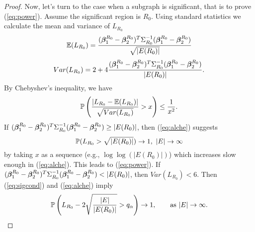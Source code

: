 \begin{proof}
Now, let's turn to the case when a subgraph is significant, that is to prove (\ref{eq:power}). Assume the significant region is $R_0$. Using standard statistics we calculate the mean and variance of $L_{R_0}$
$$
\mathbb{E}(L_{R_0})=\frac{(\bm{\beta}_1^{R_0}-\bm{\beta}_2^{R_0})^T\Sigma_{R_0}^{-1}(\bm{\beta}_1^{R_0}-\bm{\beta}_2^{R_0})}{ \sqrt{|E({R_0})|}}
$$
$$ Var(L_{R_0})=2+4\frac{(\bm{\beta}_1^{R_0}-\bm{\beta}_2^{R_0})^T\Sigma_{R_0}^{-1}(\bm{\beta}_1^{R_0}-\bm{\beta}_2^{R_0})}{ |E({R_0})|}.
$$
By Chebyshev's inequality, we have
\begin{equation}
\label{eq:alche}
\mathbb{P}\left(\frac{|L_{R_0}-\mathbb{E}(L_{R_0})|}{ \sqrt{Var(L_{R_0})}}>x\right)\le \frac{1}{x^2}.
\end{equation}
If $(\bm{\beta}_1^{R_0}-\bm{\beta}_2^{R_0})^T\Sigma_{R_0}^{-1}(\bm{\beta}_1^{R_0}-\bm{\beta}_2^{R_0})\ge |E({R_0})|$, then (\ref{eq:alche}) suggests 
$$
\mathbb{P}(L_{R_0}>\sqrt{|E(R_0)|})\to 1,\  |E|\to \infty
$$ by taking $x$ as a sequence (e.g., $\log\log(|E(R_0)|)$) which increases slow enough in (\ref{eq:alche}). This leads to (\ref{eq:power}).
If $(\Bbeta_1^{R_0}-\Bbeta_2^{R_0})^T\Sigma_{R_0}^{-1}(\Bbeta_1^{R_0}-\Bbeta_2^{R_0})<|E({R_0})|$, then $Var(L_{R_0})<6$. Then (\ref{eq:sigcond}) and (\ref{eq:alche}) imply
$$
\mathbb{P}\left(L_{R_0}-2\sqrt{\frac{|E|}{ |E(R_0)|}}>q_\alpha\right)\to 1, \qquad{\rm as}\  |E|\to \infty.
$$
\end{proof}



